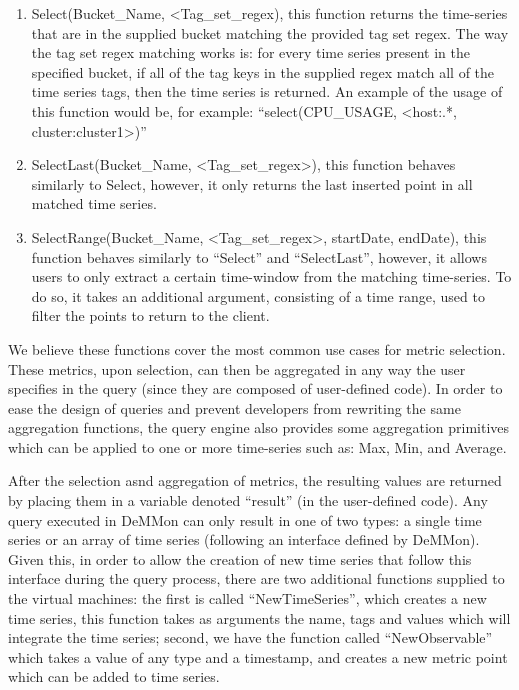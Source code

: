 \begin{enumerate}

    \item Select(Bucket\_Name, <Tag\_set\_regex), this function returns the time-series that are in the supplied bucket matching the provided tag set regex. The way the tag set regex matching works is: for every time series present in the specified bucket, if all of the tag keys in the supplied regex match all of the time series tags, then the time series is returned. An example of the usage of this function would be, for example: ``select(CPU\_USAGE, <host:.*, cluster:cluster1>)''

    \item SelectLast(Bucket\_Name, <Tag\_set\_regex>), this function behaves similarly to Select, however, it only returns the last inserted point in all matched time series.
    
    \item SelectRange(Bucket\_Name, <Tag\_set\_regex>, startDate, endDate), this function behaves similarly to ``Select'' and ``SelectLast'', however, it allows users to only extract a certain time-window from the matching time-series. To do so, it takes an additional argument, consisting of a time range, used to filter the points to return to the client.
    
\end{enumerate}


We believe these functions cover the most common use cases for metric selection. These metrics, upon selection, can then be aggregated in any way the user specifies in the query (since they are composed of user-defined code). In order to ease the design of queries and prevent developers from rewriting the same aggregation functions, the query engine also provides some aggregation primitives which can be applied to one or more time-series such as: Max, Min, and Average.

After the selection asnd aggregation of metrics, the resulting values are returned by placing them in a variable denoted ``result'' (in the user-defined code). Any query executed in DeMMon can only result in one of two types: a single time series or an array of time series (following an interface defined by DeMMon). Given this, in order to allow the creation of new time series that follow this interface during the query process, there are two additional functions supplied to the virtual machines: the first is called ``NewTimeSeries'', which creates a new time series, this function takes as arguments the name, tags and values which will integrate the time series; second, we have the function called ``NewObservable'' which takes a value of any type and a timestamp, and creates a new metric point which can be added to time series.

